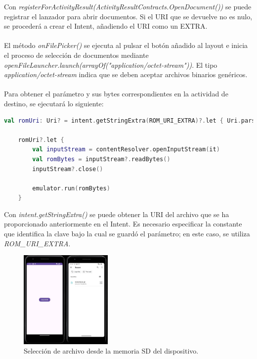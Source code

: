 Con \textit{registerForActivityResult(ActivityResultContracts.OpenDocument())} se puede registrar el lanzador para abrir documentos. Si el URI que se devuelve no es nulo, se procederá a crear el Intent, añadiendo el URI como un EXTRA.
\\\\
El método \textit{onFilePicker()} se ejecuta al pulsar el botón añadido al layout e inicia el proceso de selección de documentos mediante \textit{openFileLauncher.launch(arrayOf("application/octet-stream"))}. El tipo \textit{application/octet-stream} indica que se deben aceptar archivos binarios genéricos.
\\\\
Para obtener el parámetro y sus bytes correspondientes en la actividad de destino, se ejecutará lo siguiente:

\begin{lstlisting}[language=Kotlin, caption={Obtener EXTRA de un Intent en Android}, label={code:kotlinextra}]
    val romUri: Uri? = intent.getStringExtra(ROM_URI_EXTRA)?.let { Uri.parse(it) }

    romUri?.let {
        val inputStream = contentResolver.openInputStream(it)
        val romBytes = inputStream?.readBytes()
        inputStream?.close()

        emulator.run(romBytes)
    }
\end{lstlisting}

Con \textit{intent.getStringExtra()} se puede obtener la URI del archivo que se ha proporcionado anteriormente en el Intent. Es necesario especificar la constante que identifica la clave bajo la cual se guardó el parámetro; en este caso, se utiliza \textit{ROM\_URI\_EXTRA}.

\begin{figure}[H]
\centering
\includegraphics[width=0.4\textwidth]{include/images/openfile.jpg}
\caption{Selección de archivo desde la memoria SD del dispositivo.}
\label{figure:sdopen}
\end{figure}

